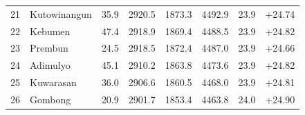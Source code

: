 \begin{table}[htbp]
{\begin{tabular}{clcccccc}
21 & Kutowinangun & 35.9 & 2920.5 & 1873.3 & 4492.9 & 23.9 & +24.74 \\
22 & Kebumen & 47.4 & 2918.9 & 1869.4 & 4488.5 & 23.9 & +24.82 \\
23 & Prembun & 24.5 & 2918.5 & 1872.4 & 4487.0 & 23.9 & +24.66 \\
24 & Adimulyo & 45.1 & 2910.2 & 1863.8 & 4473.6 & 23.9 & +24.82 \\
25 & Kuwarasan & 36.0 & 2906.6 & 1860.5 & 4468.0 & 23.9 & +24.81 \\
26 & Gombong & 20.9 & 2901.7 & 1853.4 & 4463.8 & 24.0 & +24.90 \\
\hline
\end{tabular}%
}
\end{table}
